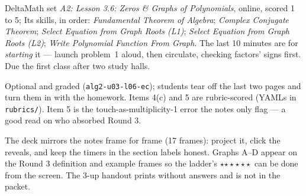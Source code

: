 \documentclass[10pt]{article}
\newcommand{\rung}[1]{{\color{goldacc}\ifcase#1\or$\star$\or$\star\star$\or$\star\star\star$\fi}}
\begin{document}
\begin{teachernote}[Homework]
DeltaMath set \emph{A2: Lesson 3.6: Zeros \& Graphs of Polynomials}, online, scored 1 to 5;
Its skills, in order: \emph{Fundamental Theorem of Algebra}; \emph{Complex Conjugate Theorem}; \emph{Select Equation from Graph Roots (L1)}; \emph{Select Equation from Graph Roots (L2)}; \emph{Write Polynomial Function From Graph}. The last 10 minutes are for
\emph{starting} it --- launch problem~1 aloud, then circulate, checking factors' signs first. Due
the first class after two study halls.
\end{teachernote}

\begin{teachernote}
Optional and graded (\texttt{alg2-u03-l06-ec}); students tear off the last two pages and turn them
in with the homework. Items 4(c) and 5 are rubric-scored (YAMLs in \texttt{rubrics/}). Item 5 is
the touch-as-multiplicity-1 error the notes only flag --- a good read on who absorbed Round 3.
\end{teachernote}

\begin{teachernote}[Slides]
The deck mirrors the notes frame for frame (17 frames): project it, click the reveals, and keep
the timers in the section labels honest. Graphs A--D appear on the Round 3 definition and example
frames so the ladder's \rung2\ can be done from the screen. The 3-up handout prints without
answers and is not in the packet.
\end{teachernote}
\end{document}
